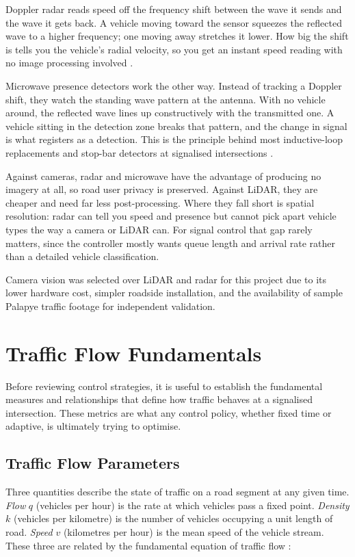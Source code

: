﻿\documentclass[11pt, a4paper]{report}
\begin{document}
Doppler radar reads speed off the frequency shift between the wave it sends and the wave it gets back. A vehicle moving toward the sensor squeezes the reflected wave to a higher frequency; one moving away stretches it lower. How big the shift is tells you the vehicle's radial velocity, so you get an instant speed reading with no image processing involved \cite{lv2019lidar}.

Microwave presence detectors work the other way. Instead of tracking a Doppler shift, they watch the standing wave pattern at the antenna. With no vehicle around, the reflected wave lines up constructively with the transmitted one. A vehicle sitting in the detection zone breaks that pattern, and the change in signal is what registers as a detection. This is the principle behind most inductive-loop replacements and stop-bar detectors at signalised intersections \cite{michailidis2025traffic}.

Against cameras, radar and microwave have the advantage of producing no imagery at all, so road user privacy is preserved. Against LiDAR, they are cheaper and need far less post-processing. Where they fall short is spatial resolution: radar can tell you speed and presence but cannot pick apart vehicle types the way a camera or LiDAR can. For signal control that gap rarely matters, since the controller mostly wants queue length and arrival rate rather than a detailed vehicle classification.

Camera vision was selected over LiDAR and radar for this project due to its lower hardware cost, simpler roadside installation, and the availability of sample Palapye traffic footage for independent validation.\\

\section{Traffic Flow Fundamentals}

Before reviewing control strategies, it is useful to establish the fundamental measures and relationships that define how traffic behaves at a signalised intersection. These metrics are what any control policy, whether fixed time or adaptive, is ultimately trying to optimise.

\subsection{Traffic Flow Parameters}

Three quantities describe the state of traffic on a road segment at any given time. \textit{Flow} $q$ (vehicles per hour) is the rate at which vehicles pass a fixed point. \textit{Density} $k$ (vehicles per kilometre) is the number of vehicles occupying a unit length of road. \textit{Speed} $v$ (kilometres per hour) is the mean speed of the vehicle stream. These three are related by the fundamental equation of traffic flow \cite{tang2019global}:
\end{document}
